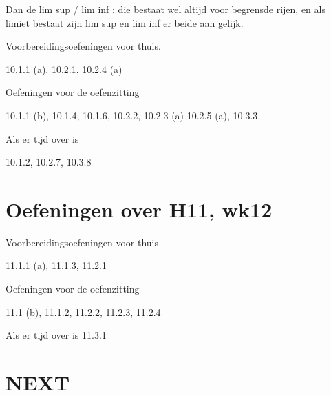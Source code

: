 \documentclass{article}
\begin{document}
Dan de lim sup / lim inf : die bestaat wel altijd voor begrensde rijen, en als limiet bestaat zijn lim sup en lim inf er beide aan gelijk. 

Voorbereidingsoefeningen voor thuis.

10.1.1 (a), 10.2.1, 10.2.4 (a) 



Oefeningen voor de oefenzitting 

 10.1.1 (b), 10.1.4, 10.1.6, 10.2.2, 10.2.3 (a) 10.2.5 (a), 10.3.3 

 Als er tijd over is 

10.1.2, 10.2.7, 10.3.8 

\section{Oefeningen over H11, wk12} 


Voorbereidingsoefeningen voor thuis

11.1.1 (a), 11.1.3, 11.2.1

Oefeningen voor de oefenzitting 

11.1 (b), 11.1.2, 11.2.2, 11.2.3, 11.2.4

Als er tijd over is 11.3.1


\section*{NEXT}
\end{document}
